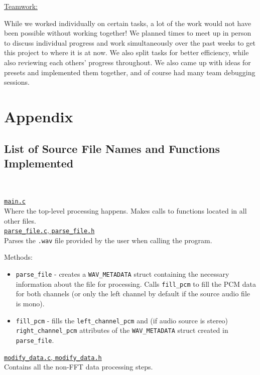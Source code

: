 \documentclass[11pt]{extarticle}
\begin{document}
\underline{Teamwork:}

While we worked individually on certain tasks, a lot of the work would not have been possible without working together! We planned times to meet up in person to discuss individual progress and work simultaneously over the past weeks to get this project to where it is at now. We also split tasks for better efficiency, while also reviewing each others' progress throughout. We also came up with ideas for presets and implemented them together, and of course had many team debugging sessions.

\section{Appendix}

\subsection{List of Source File Names and Functions Implemented}

\ 

\underline{\texttt{main.c}}\\

Where the top-level processing happens. Makes calls to functions located in all other files.\\

\underline{\texttt{parse\_file.c}, \texttt{parse\_file.h}}\\

Parses the \texttt{.wav} file provided by the user when calling the program.

Methods:
\begin{itemize}
    \item \texttt{parse\_file} - creates a \texttt{WAV\_METADATA} struct containing the necessary information about the file for processing. Calls \texttt{fill\_pcm} to fill the PCM data for both channels (or only the left channel by default if the source audio file is mono). 
    \item \texttt{fill\_pcm} - fills the \texttt{left\_channel\_pcm} and (if audio source is stereo) \texttt{right\_channel\_pcm} attributes of the \texttt{WAV\_METADATA} struct created in \texttt{parse\_file}.
\end{itemize}

\underline{\texttt{modify\_data.c}, \texttt{modify\_data.h}}\\

Contains all the non-FFT data processing steps.
\end{document}
